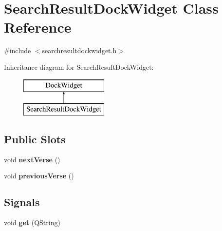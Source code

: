 \hypertarget{classSearchResultDockWidget}{
\section{SearchResultDockWidget Class Reference}
\label{classSearchResultDockWidget}
}


{\ttfamily \#include $<$searchresultdockwidget.h$>$}

Inheritance diagram for SearchResultDockWidget:\begin{figure}[H]
\begin{center}
\leavevmode
\includegraphics[height=2cm]{classSearchResultDockWidget}
\end{center}
\end{figure}
\subsection*{Public Slots}
\begin{DoxyCompactItemize}
\item 
\hypertarget{classSearchResultDockWidget_ab87a521289dcf8e14b1e35067e930d3e}{
void {\bfseries nextVerse} ()}
\label{classSearchResultDockWidget_ab87a521289dcf8e14b1e35067e930d3e}

\item 
\hypertarget{classSearchResultDockWidget_a9574dd6d9cb39058c035104ac94d9873}{
void {\bfseries previousVerse} ()}
\label{classSearchResultDockWidget_a9574dd6d9cb39058c035104ac94d9873}

\end{DoxyCompactItemize}
\subsection*{Signals}
\begin{DoxyCompactItemize}
\item 
\hypertarget{classSearchResultDockWidget_a0b26a9693ee123e043d0ab3b374a8d0f}{
void {\bfseries get} (QString)}
\label{classSearchResultDockWidget_a0b26a9693ee123e043d0ab3b374a8d0f}

\end{DoxyCompactItemize}
